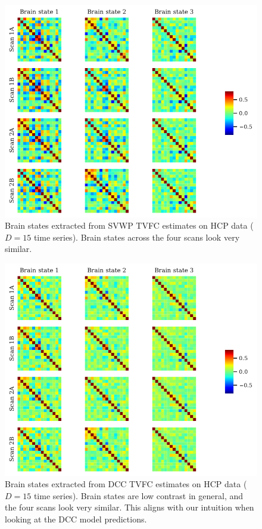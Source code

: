\begin{figure}[ht]
  \centering
  \includegraphics[width=\textwidth, trim={0.0cm 0cm 0.0cm 0cm}, clip]{fig/hcp/d15/brain_states/k03/brain_states_SVWP_joint}
  \caption{
    Brain states extracted from SVWP TVFC estimates on HCP data ($D = 15$ time series).
    Brain states across the four scans look very similar.
  }\label{fig:hcp-results-brain-states-svwp}
\end{figure}


\begin{figure}[ht]
  \centering
  \includegraphics[width=\textwidth, trim={0.0cm 0cm 0.0cm 0cm}, clip]{fig/hcp/d15/brain_states/k03/brain_states_DCC_joint}
  \caption{
    Brain states extracted from DCC TVFC estimates on HCP data ($D = 15$ time series).
    Brain states are low contrast in general, and the four scans look very similar.
    This aligns with our intuition when looking at the DCC model predictions.
  }\label{fig:hcp-results-brain-states-dcc}
\end{figure}


